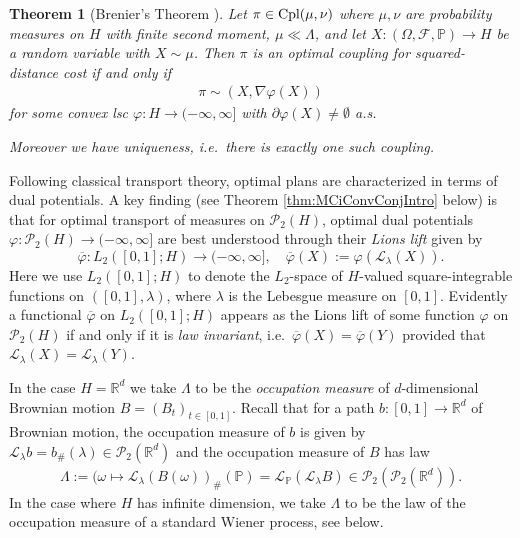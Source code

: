 \documentclass[a4paper]{amsart}
\newtheorem{theorem}{Theorem}
\numberwithin{theorem}{section}
\theoremstyle{definition}
\newcommand{\R}{\mathbb{R}}
\newcommand{\F}{\mathcal{F}}
\newcommand{\law}{\mathcal{L}}
\newcommand{\cpl}{\textup{Cpl}}
\newcommand{\Pc}{\mathcal P}
\renewcommand{\P}{\mathbb{P}}
\renewcommand{\phi}{\varphi}
\begin{document}
\begin{theorem}[Brenier's Theorem \cite{Br91, AmGiSa08}]\label{thm:coupling_Brenier} 
Let $\pi\in \cpl(\mu,\nu)$ where  $\mu, \nu$ are probability measures on $H$ with finite second moment,  $\mu \ll \Lambda $, and let $X:(\Omega, \F, \P)\to H$ be a random variable with   $X \sim \mu$.
Then $\pi$ is an  optimal coupling for squared-distance cost if and only if 
\begin{align} 
\pi \sim (X,\nabla\phi (X))
\end{align}
for some convex lsc $\phi: H \to (-\infty, \infty]$ with $\partial \phi(X) \neq \emptyset$ a.s.




Moreover we have uniqueness, i.e.\ there is exactly one such coupling.
\end{theorem}



Following classical transport theory, optimal plans are characterized in terms of dual potentials. A key finding (see Theorem \ref{thm:MCiConvConjIntro} below) is that for optimal transport of measures on $\Pc_2(H)$, optimal dual potentials $\phi:\Pc_2(H)\to (-\infty, \infty]$ are best understood through their \emph{Lions lift} given by 
$$\overline\phi: L_2([0,1]; H) \to (-\infty, \infty], \quad \overline\phi(X):= \phi(\law_\lambda(X) ).$$
Here we use $L_2([0,1]; H)$ to denote the $L_2$-space of $H$-valued square-integrable functions on 
$([0,1], \lambda)$, where $\lambda$ is the  Lebesgue measure on $[0,1]$.
Evidently a functional $\overline\phi$ on  $L_2([0,1]; H)$ appears as the Lions lift of some function $\phi$ on $\Pc_2(H)$ if and only if it is \emph{law invariant}, i.e.\ $\overline\phi(X)= \overline\phi(Y)$ provided that $\law_\lambda (X) = \law_\lambda(Y)$. 


 In the case $H= \R^d$ we take $\Lambda$ to be the \emph{occupation  measure} of $d$-dimensional Brownian motion $B=(B_t)_{t\in [0,1]}$. Recall that for a path $b:[0,1]\to \R^d$ of Brownian motion, the occupation  measure of $b$ is given by $\law_\lambda b = b_{\#}(\lambda)\in \Pc_2(\R^d)$ and  the occupation  measure of $B$ has law 
\begin{align}
    \Lambda:= (\omega \mapsto \law_\lambda(B(\omega) )_{\#}(\P)  = \law_{\P} (\law_\lambda B) \in \Pc_2(\Pc_2(\R^d)). 
\end{align}
In the case where $H$ has infinite dimension, we take $\Lambda$ to be the law of the occupation  measure of a standard Wiener process, see  below. 
\end{document}
